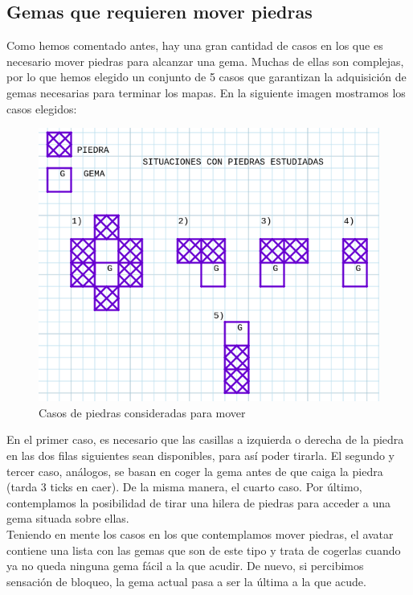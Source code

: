 \subsection{Gemas que requieren mover piedras}

Como hemos comentado antes, hay una gran cantidad de casos en los que es necesario mover piedras para alcanzar una gema. Muchas de ellas son complejas, por lo que hemos elegido un conjunto de 5 casos que garantizan la adquisición de gemas necesarias para terminar los mapas. En la siguiente imagen mostramos los casos elegidos:
 
\begin{figure}[H] %
	\centering
	\includegraphics[scale=0.6]{piedras.png}  %
	\caption{Casos de piedras consideradas para mover} 
	\label{fig:piedras}
\end{figure}

En el primer caso, es necesario que las casillas a izquierda o derecha de la piedra en las dos filas siguientes sean disponibles, para así poder tirarla. El segundo y tercer caso, análogos, se basan en coger la gema antes de que caiga la piedra (tarda 3 ticks en caer). De la misma manera, el cuarto caso. Por último, contemplamos la posibilidad de tirar una hilera de piedras para acceder a una gema situada sobre ellas. \\

Teniendo en mente los casos en los que contemplamos mover piedras, el avatar contiene una lista con las gemas que son de este tipo y trata de cogerlas cuando ya no queda ninguna gema fácil a la que acudir. De nuevo, si percibimos sensación de bloqueo, la gema actual pasa a ser la última a la que acude.

